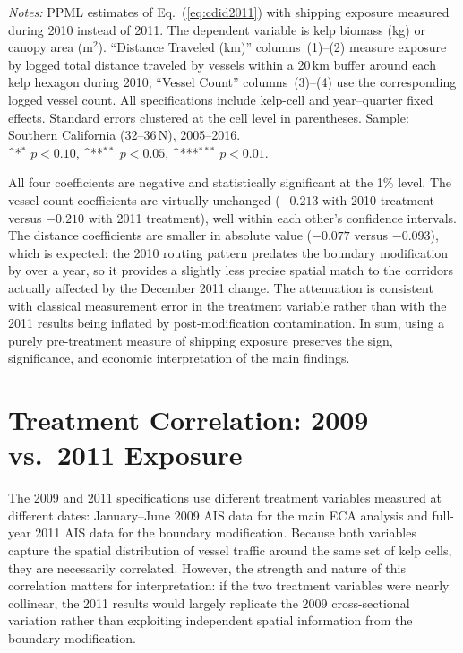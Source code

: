 \documentclass[12pt]{article}
\providecommand{\sym}[1]{\ifmmode^{#1}\else\(^{#1}\)\fi}
\begin{document}
\begin{table}[H]
  \centering
  \caption{Robustness: 2010 shipping exposure as treatment variable}
  \label{tab:2010treat}
  
  \vspace{0.5em}

  \begin{minipage}{\linewidth}
  \footnotesize
  \textit{Notes:} PPML estimates of Eq.~(\ref{eq:cdid2011}) with shipping exposure measured during 2010 instead of 2011. The dependent variable is kelp biomass (kg) or canopy area (m$^{2}$). ``Distance Traveled (km)'' columns~(1)--(2) measure exposure by logged total distance traveled by vessels within a 20\,km buffer around each kelp hexagon during 2010; ``Vessel Count'' columns~(3)--(4) use the corresponding logged vessel count. All specifications include kelp-cell and year--quarter fixed effects. Standard errors clustered at the cell level in parentheses. Sample: Southern California (32\textdegree--36\textdegree\,N), 2005--2016.\\
  \sym{*} \(p<0.10\), \sym{**} \(p<0.05\), \sym{***} \(p<0.01\).
  \end{minipage}
\end{table}

All four coefficients are negative and statistically significant at the 1\% level. The vessel count coefficients are virtually unchanged ($-0.213$ with 2010 treatment versus $-0.210$ with 2011 treatment), well within each other's confidence intervals. The distance coefficients are smaller in absolute value ($-0.077$ versus $-0.093$), which is expected: the 2010 routing pattern predates the boundary modification by over a year, so it provides a slightly less precise spatial match to the corridors actually affected by the December 2011 change. The attenuation is consistent with classical measurement error in the treatment variable rather than with the 2011 results being inflated by post-modification contamination. In sum, using a purely pre-treatment measure of shipping exposure preserves the sign, significance, and economic interpretation of the main findings.

\newpage

\section{Treatment Correlation: 2009 vs.\ 2011 Exposure}\label{appendix_treat_corr}

The 2009 and 2011 specifications use different treatment variables measured at different dates: January--June 2009 AIS data for the main ECA analysis and full-year 2011 AIS data for the boundary modification. Because both variables capture the spatial distribution of vessel traffic around the same set of kelp cells, they are necessarily correlated. However, the strength and nature of this correlation matters for interpretation: if the two treatment variables were nearly collinear, the 2011 results would largely replicate the 2009 cross-sectional variation rather than exploiting independent spatial information from the boundary modification.
\end{document}
